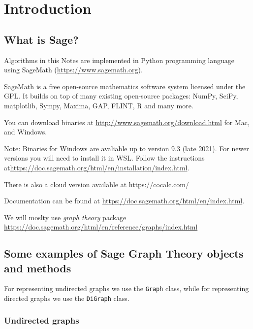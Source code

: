 \chapter{Introduction}

\section{What is Sage?}

Algorithms in this Notes are implemented in Python programming language using SageMath (\url{https://www.sagemath.org}).


\begin{dBox}
SageMath is a free open-source mathematics software system licensed under the GPL.
It builds on top of many existing open-source packages: NumPy, SciPy, matplotlib, Sympy, Maxima, GAP, FLINT,
R and many more.
\end{dBox}

You can download binaries at \url{http://www.sagemath.org/download.html} for Mac, and Windows.

Note: Binaries for Windows are avaliable up to version 9.3 (late 2021).
For newer versions you will need to install it in WSL. Follow the instructions at\url{https://doc.sagemath.org/html/en/installation/index.html}.


There is also a cloud version available at https://cocalc.com/


\noindent Documentation can be found at \url{https://doc.sagemath.org/html/en/index.html}.

\noindent We will moslty use \emph{graph theory} package \url{https://doc.sagemath.org/html/en/reference/graphs/index.html}

\section{Some examples of Sage Graph Theory objects and methods}

For representing undirected graphs we use the \texttt{Graph} class, while for representing directed graphs we use the \texttt{DiGraph} class.

\subsection{Undirected graphs}

